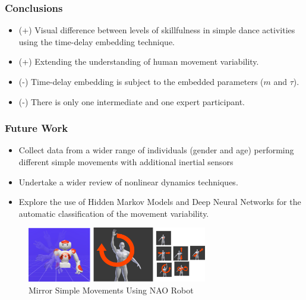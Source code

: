\documentclass{beamer}
\begin{document}
\begin{frame}
\frametitle{Conclusions}
\vspace{-0.7cm}

    \begin{itemize}
    \item (+) Visual difference between levels of skillfulness in simple dance activities
    using the time-delay embedding technique.
    \item (+) Extending the understanding of human movement variability.
    \end{itemize}

    \begin{itemize}
    \item (-) Time-delay embedding is subject to the embedded parameters ($m$ and $\tau$).
    \item (-) There is only one intermediate and one expert participant.

    \end{itemize}


\end{frame}



\begin{frame}
\frametitle{Future Work}
\vspace{-0.7cm}

    \begin{itemize}
    \item Collect data from a wider range of individuals (gender and age) performing
    different simple movements with additional inertial sensors
    \item Undertake a wider review of nonlinear dynamics techniques.
    \item Explore the use of Hidden Markov Models and Deep Neural Networks
    for the automatic classification of the movement variability.
    \end{itemize}

    \begin{figure}[!htb]
    \centering
    \includegraphics[width=0.7\textwidth]{future_work_00}
    \caption[PA]{Mirror Simple Movements Using NAO Robot}

    \label{fig:sn}
    \end{figure}


\end{frame}
\end{document}
